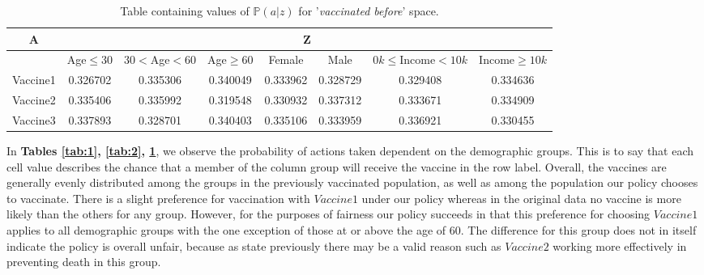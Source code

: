\documentclass{article}
\begin{document}
\begin{center}
\begin{table}[H]
\begin{adjustbox}{max width=\textwidth}
\begin{tabular}{ |c| c c c c c c c|}
\hline
A  & \multicolumn{7}{c|}{Z} \\
\hline
  & Age$\leq30$ &    $30<$Age$<60$ &     Age$\geq60$ &    Female &      Male &   $0k\leq$Income$<10k$ &    Income$\geq10k$ \\
\hline
 Vaccine1 &  0.326702 &  0.335306 &  0.340049 &  0.333962 &  0.328729 &  0.329408 &  0.334636 \\
 Vaccine2 &  0.335406 &  0.335992 &  0.319548 &  0.330932 &  0.337312 &  0.333671 &  0.334909 \\
 Vaccine3 &  0.337893 &  0.328701 &  0.340403 &  0.335106 &  0.333959 &  0.336921 &  0.330455
  \\ \hline
\end{tabular}
\end{adjustbox}
\caption{Table containing values of $\mathbb{P}(a|z)$ for '\textit{vaccinated before}' space.}
\label{tab:3}
\end{table}
\end{center}

In \textbf{Tables \ref{tab:1}, \ref{tab:2}, \ref{tab:3}}, we observe the probability of actions taken dependent on the demographic groups. This is to say that each cell value describes the chance that a member of the column group will receive the vaccine in the row label. Overall, the vaccines are generally evenly distributed among the groups in the previously vaccinated population, as well as among the population our policy chooses to vaccinate. There is a slight preference for vaccination with $Vaccine1$ under our policy whereas in the original data no vaccine is more likely than the others for any group. However, for the purposes of fairness our policy succeeds in that this preference for choosing $Vaccine1$ applies to all demographic groups with the one exception of those at or above the age of $60$. The difference for this group does not in itself indicate the policy is overall unfair, because as state previously there may be a valid reason such as $Vaccine2$ working more effectively in preventing death in this group.
\end{document}
